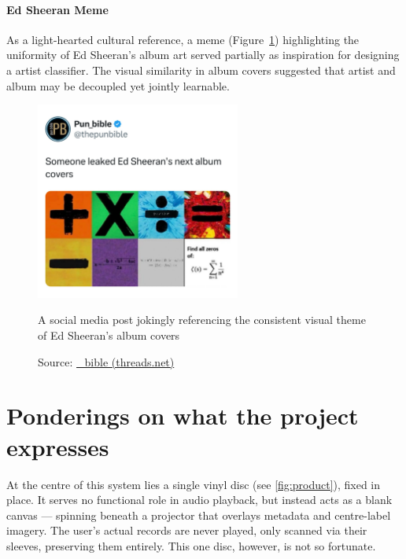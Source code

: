 \begin{uomappendix}
                \paragraph{Ed Sheeran Meme} As a light-hearted cultural reference, a meme (Figure~\ref{fig:EdMeme}) highlighting the uniformity of Ed Sheeran’s album art served partially as inspiration for designing a artist classifier. The visual similarity in album covers suggested that artist and album may be decoupled yet jointly learnable.
    
                \begin{figure}[H]
                    \centering
                    \includegraphics[width=0.6\textwidth]{images/EdSheeranMeme.jpg}
                    \caption{A social media post jokingly referencing the consistent visual theme of Ed Sheeran's album covers}
                    \label{fig:EdMeme}
                    \caption*{Source: \href{https://www.threads.net/@pun_bible/post/DB83pw3gZSh/media}{\@pun\_bible (threads.net)}}
                \end{figure}
    
        \section{Ponderings on what the project expresses} \label{sec:nailArt}
    
        At the centre of this system lies a single vinyl disc (see \ref{fig:product}), fixed in place. It serves no functional role in audio playback, but instead acts as a blank canvas — spinning beneath a projector that overlays metadata and centre-label imagery. The user’s actual records are never played, only scanned via their sleeves, preserving them entirely. This one disc, however, is not so fortunate.
    

\end{uomappendix}
